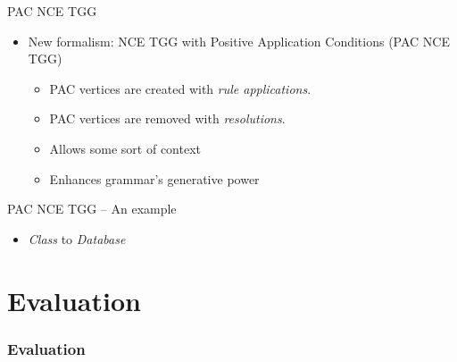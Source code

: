 \documentclass[usenames,dvipsnames]{beamer}
\begin{document}
	\begin{frame}{PAC NCE TGG}
		\begin{itemize}
			\item New formalism: NCE TGG with Positive Application Conditions (PAC NCE TGG)
			\begin{itemize}
				\item PAC vertices are created with \emph{rule applications}.
				\item PAC vertices are removed with \emph{resolutions}.
				\item Allows some sort of context
				\item Enhances grammar's generative power
			\end{itemize}
		\end{itemize}
	\end{frame}
	
	\begin{frame}{PAC NCE TGG -- An example}
		\begin{itemize}
			\item \emph{Class} to \emph{Database}
		\end{itemize}
		
	\end{frame}

	\section{Evaluation}
	\begin{frame}
		\frametitle{Evaluation}
	\end{frame}
	
\end{document}
